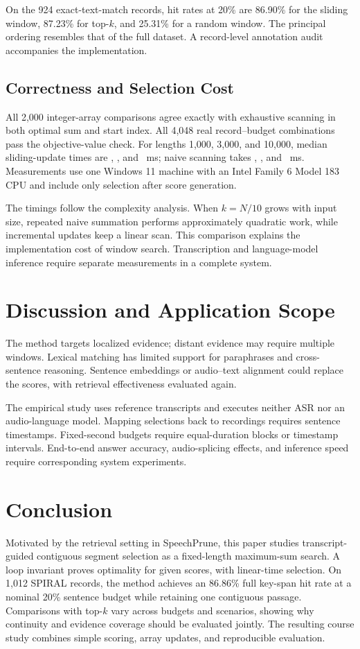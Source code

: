 \documentclass[10pt,journal,compsoc]{IEEEtran}
\begin{document}
On the 924 exact-text-match records, hit rates at 20\% are 86.90\% for the sliding window, 87.23\% for top-$k$, and 25.31\% for a random window. The principal ordering resembles that of the full dataset. A record-level annotation audit accompanies the implementation.

\subsection{Correctness and Selection Cost}
All 2,000 integer-array comparisons agree exactly with exhaustive scanning in both optimal sum and start index. All 4,048 real record--budget combinations pass the objective-value check. For lengths 1,000, 3,000, and 10,000, median sliding-update times are \SlideSmall, \SlideMedium, and \SlideLarge\ ms; naive scanning takes \NaiveSmall, \NaiveMedium, and \NaiveLarge\ ms. Measurements use one Windows 11 machine with an Intel Family 6 Model 183 CPU and include only selection after score generation.

The timings follow the complexity analysis. When $k=N/10$ grows with input size, repeated naive summation performs approximately quadratic work, while incremental updates keep a linear scan. This comparison explains the implementation cost of window search. Transcription and language-model inference require separate measurements in a complete system.

\section{Discussion and Application Scope}
The method targets localized evidence; distant evidence may require multiple windows. Lexical matching has limited support for paraphrases and cross-sentence reasoning. Sentence embeddings or audio--text alignment could replace the scores, with retrieval effectiveness evaluated again.

The empirical study uses reference transcripts and executes neither ASR nor an audio-language model. Mapping selections back to recordings requires sentence timestamps. Fixed-second budgets require equal-duration blocks or timestamp intervals. End-to-end answer accuracy, audio-splicing effects, and inference speed require corresponding system experiments.

\section{Conclusion}
Motivated by the retrieval setting in SpeechPrune, this paper studies transcript-guided contiguous segment selection as a fixed-length maximum-sum search. A loop invariant proves optimality for given scores, with linear-time selection. On 1,012 SPIRAL records, the method achieves an 86.86\% full key-span hit rate at a nominal 20\% sentence budget while retaining one contiguous passage. Comparisons with top-$k$ vary across budgets and scenarios, showing why continuity and evidence coverage should be evaluated jointly. The resulting course study combines simple scoring, array updates, and reproducible evaluation.
\end{document}
